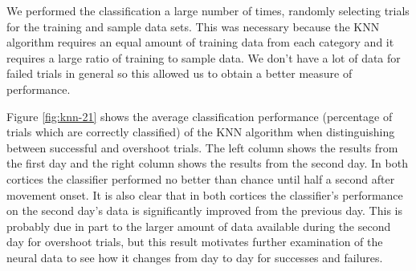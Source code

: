 \documentclass[11pt,a4paper]{article}
\begin{document}
We performed the classification a large number of times, randomly selecting trials for the training and sample data sets. This was necessary because the KNN algorithm requires an equal amount of training data from each category and it requires a large ratio of training to sample data. We don't have a lot of data for failed trials in general so this allowed us to obtain a better measure of performance. 

Figure \ref{fig:knn-21} shows the average classification performance (percentage of trials which are correctly classified) of the KNN algorithm when distinguishing between successful and overshoot trials. The left column shows the results from the first day and the right column shows the results from the second day. In both cortices the classifier performed no better than chance until half a second after movement onset. It is also clear that in both cortices the classifier's performance on the second day's data is significantly improved from the previous day. This is probably due in part to the larger amount of data available during the second day for overshoot trials, but this result motivates further examination of the neural data to see how it changes from day to day for successes and failures.
\end{document}

